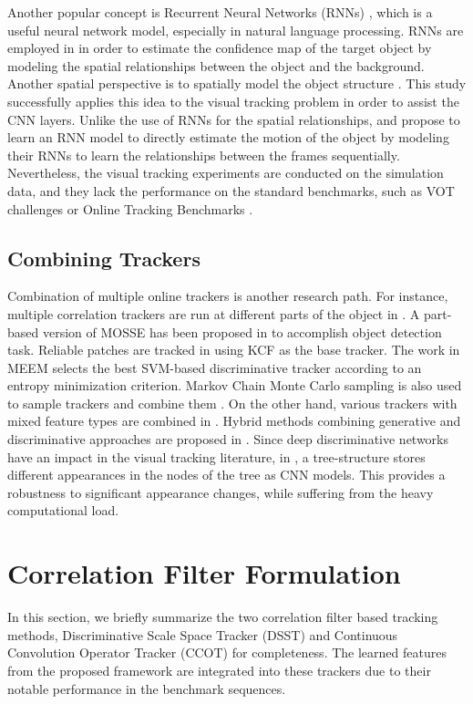\documentclass[journal]{IEEEtran}
\begin{document}
Another popular concept is Recurrent Neural Networks (RNNs) \cite{RNNBook}, which is a useful neural network model, especially in natural language processing. RNNs are employed in \cite{RTT} in order to estimate the confidence map of the target object by modeling the spatial relationships between the object and the background. Another spatial perspective is to spatially model the object structure \cite{SANet}. This study successfully applies this idea to the visual tracking problem in order to assist the CNN layers. Unlike the use of RNNs for the spatial relationships, \cite{RATM} and \cite{RATMlike} propose to learn an RNN model to directly estimate the motion of the object by modeling their RNNs to learn the relationships between the frames sequentially. Nevertheless, the visual tracking experiments are conducted on the simulation data, and they lack the performance on the standard benchmarks, such as VOT challenges \cite{VOT2014,VOT2015,VOT2016} or Online Tracking Benchmarks \cite{Benchmark2013,BenchmarkPAMI}.

\subsection{Combining Trackers}
Combination of multiple online trackers is another research path. For instance, multiple correlation trackers are run at different parts of the object in \cite{PartBasedCorrelation}. A part-based version of MOSSE \cite{MOSSE} has been proposed in \cite{POSSE} to accomplish object detection task. Reliable patches are tracked in \cite{RPT} using KCF \cite{KCF} as the base tracker. The work in MEEM \cite{MEEM} selects the best SVM-based discriminative tracker according to an entropy minimization criterion. Markov Chain Monte Carlo sampling is also used to sample trackers and combine them \cite{expert2}. On the other hand, various trackers with mixed feature types are combined in \cite{expert3}. Hybrid methods combining generative and discriminative approaches are proposed in \cite{expert5, expert4}.
Since deep discriminative networks \cite{MDNET} have an impact in the visual tracking literature, in \cite{TCNN}, a tree-structure stores different appearances in the nodes of the tree as CNN models. This provides a robustness to significant appearance changes, while suffering from the heavy computational load.

\section{Correlation Filter Formulation}
\label{secCFB}
In this section, we briefly summarize the two correlation filter based tracking methods, Discriminative Scale Space Tracker (DSST) \cite{DSST} and Continuous Convolution Operator Tracker (CCOT) \cite{CCOT} for completeness. The learned features from the proposed framework are integrated into these trackers due to their notable performance in the benchmark sequences.
\end{document}
